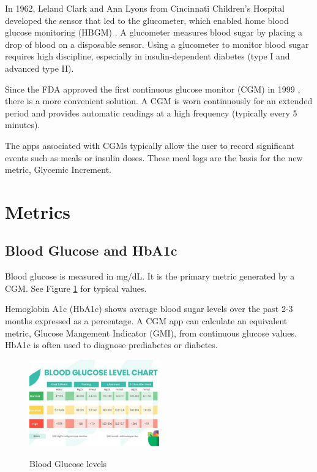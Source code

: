 \documentclass[conference]{IEEEtran}
\begin{document}
In 1962, Leland Clark and Ann Lyons from Cincinnati Children's Hospital developed the sensor that led to the glucometer, which enabled home blood glucose monitoring (HBGM) \cite{Clark_1962}. A glucometer measures blood sugar by placing a drop of blood on a disposable sensor. Using a glucometer to monitor blood sugar requires high discipline, especially in insulin-dependent diabetes (type I and advanced type II).

Since the FDA approved the first continuous glucose monitor (CGM) in 1999 \cite{Reddy_2023}, there is a more convenient solution. A CGM is worn continuously for an extended period and provides automatic readings at a high frequency (typically every 5 minutes).

The apps associated with CGMs typically allow the user to record significant events such as meals or insulin doses. These meal logs are the basis for the new metric, Glycemic Increment.

\section{Metrics}

\subsection{Blood Glucose and HbA1c}

Blood glucose is measured in mg/dL. It is the primary metric generated by a CGM. See Figure \ref{fig:glucose_chart} for typical values.

Hemoglobin A1c (HbA1c) shows average blood sugar levels over the past 2-3 months expressed as a percentage. A CGM app can calculate an equivalent metric, Glucose Mangement Indicator (GMI), from continuous glucose values. HbA1c is often used to diagnose prediabetes or diabetes.

\begin{figure}[h]
    \includegraphics[width=0.5\textwidth]{images/Normal-Blood-Sugar-Levels-Chart.jpg}
    \label{fig:glucose_chart}
    \caption{Blood Glucose levels \protect\cite{Agarwal_2025}}
\end{figure}
\end{document}
